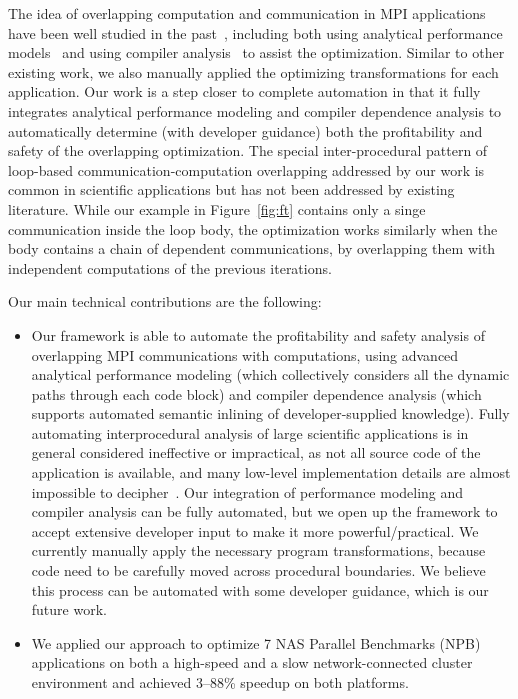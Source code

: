 The idea of overlapping computation and communication in MPI applications have been
well studied in the past~\cite{danalis:sc05,fishgold:ipdps06}, including both using analytical performance
models~\cite{iancu:ppopp07}
and using compiler analysis~\cite{danalis:ics09} to assist the optimization.
Similar to other existing work, we also manually applied the optimizing transformations for each application.
Our work is a step closer to complete automation in that it fully integrates analytical performance modeling and compiler dependence analysis to automatically
determine (with developer guidance) both the profitability and safety of the overlapping optimization. %
The special inter-procedural pattern of loop-based
communication-computation overlapping addressed by our work is common in scientific applications but has not been addressed
by existing literature. While our example in Figure~\ref{fig:ft} contains only a singe communication inside the loop body, the optimization works similarly 
when the body contains a chain of dependent communications, by overlapping them with independent computations of the previous iterations.  

Our main technical contributions are the following:

\begin{itemize}

\item Our framework is able to automate the profitability and safety analysis of 
overlapping MPI communications with computations, using advanced analytical performance
modeling (which collectively considers all the dynamic paths through each code block) and compiler dependence analysis
(which supports automated semantic inlining of developer-supplied knowledge). Fully automating interprocedural
analysis of large scientific applications is in general considered ineffective or impractical, as not all source code
of the application is available, and many low-level implementation details are almost impossible to decipher~\cite{POET:ICPP11}. Our integration
of performance modeling and compiler analysis can be fully automated, but we open up the framework
to accept extensive developer input to make it more powerful/practical. We currently manually apply the necessary program transformations, 
  because code need to be carefully moved across procedural boundaries. We believe this process can be automated with some developer
guidance, which is our future work. 

\item We applied our approach to optimize 7 NAS Parallel Benchmarks
  (NPB) applications on both a high-speed and a slow network-connected
  cluster environment and achieved 3--88\% speedup on both platforms.

\end{itemize}


